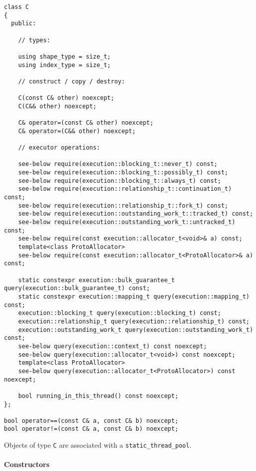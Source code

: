 \documentclass[a4paper,12pt,notitlepage,twoside,openright]{article}
\begin{document}
\begin{verbatim}
class C
{
  public:

    // types:

    using shape_type = size_t;
    using index_type = size_t;

    // construct / copy / destroy:

    C(const C& other) noexcept;
    C(C&& other) noexcept;

    C& operator=(const C& other) noexcept;
    C& operator=(C&& other) noexcept;

    // executor operations:

    see-below require(execution::blocking_t::never_t) const;
    see-below require(execution::blocking_t::possibly_t) const;
    see-below require(execution::blocking_t::always_t) const;
    see-below require(execution::relationship_t::continuation_t) const;
    see-below require(execution::relationship_t::fork_t) const;
    see-below require(execution::outstanding_work_t::tracked_t) const;
    see-below require(execution::outstanding_work_t::untracked_t) const;
    see-below require(const execution::allocator_t<void>& a) const;
    template<class ProtoAllocator>
    see-below require(const execution::allocator_t<ProtoAllocator>& a) const;

    static constexpr execution::bulk_guarantee_t query(execution::bulk_guarantee_t) const;
    static constexpr execution::mapping_t query(execution::mapping_t) const;
    execution::blocking_t query(execution::blocking_t) const;
    execution::relationship_t query(execution::relationship_t) const;
    execution::outstanding_work_t query(execution::outstanding_work_t) const;
    see-below query(execution::context_t) const noexcept;
    see-below query(execution::allocator_t<void>) const noexcept;
    template<class ProtoAllocator>
    see-below query(execution::allocator_t<ProtoAllocator>) const noexcept;

    bool running_in_this_thread() const noexcept;
};

bool operator==(const C& a, const C& b) noexcept;
bool operator!=(const C& a, const C& b) noexcept;
\end{verbatim}

Objects of type \texttt{C} are associated with a
\texttt{static_thread_pool}.

\hypertarget{constructors-2}{%
\paragraph{Constructors}\label{constructors-2}}
\end{document}
